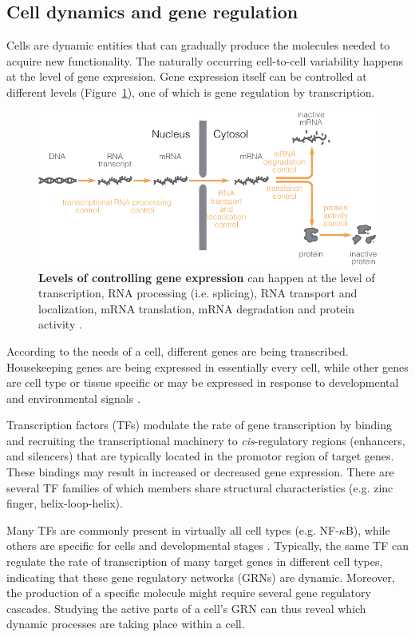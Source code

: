 \subsection{Cell dynamics and gene regulation}
Cells are dynamic entities that can gradually produce the molecules needed to acquire new functionality. The naturally occurring cell-to-cell variability happens at the level of gene expression. Gene expression itself can be controlled at different levels (Figure~\ref{fig:controlexpression}), one of which is gene regulation by transcription.

\begin{figure}[ht!]
	\centering
	\includegraphics[width=\linewidth]{fig/control_gene_expression}
	\caption{
		\textbf{Levels of controlling gene expression} can happen at the level of transcription, RNA processing (i.e. splicing), RNA transport and localization, mRNA translation, mRNA degradation and protein activity \cite{alberts_overviewgenecontrol_2002}.
	}
	\label{fig:controlexpression}
\end{figure}

According to the needs of a cell, different genes are being transcribed. Housekeeping genes are being expressed in essentially every cell, while other genes are cell type or tissue specific or may be expressed in response to developmental and environmental signals \cite{strachan_humanmoleculargenetics_2011}. 

Transcription factors (TFs) modulate the rate of gene transcription by binding and recruiting the transcriptional machinery to \emph{cis}-regulatory regions (enhancers, and silencers) that are typically located in the promotor region of target genes. These bindings may result in increased or decreased gene expression. 
There are several TF families of which members share structural characteristics (e.g. zinc finger, helix-loop-helix).

Many TFs are commonly present in virtually all cell types (e.g. NF-$\kappa$B), while others are specific for cells and developmental stages \cite{lambert_humantranscriptionfactors_2018}. Typically, the same TF can regulate the rate of transcription of many target genes in different cell types, indicating that these gene regulatory networks (GRNs) are dynamic. Moreover, the production of a specific molecule might require several gene regulatory cascades. Studying the active parts of a cell's GRN can thus reveal which dynamic processes are taking place within a cell.


